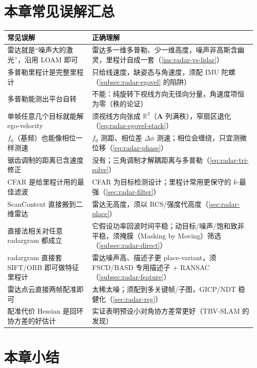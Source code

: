 \section*{本章常见误解汇总}
\begin{table}[H]\centering\small
\begin{tabular}{p{} p{}}
\toprule
\textbf{常见误解} & \textbf{正确理解} \\
\midrule
雷达就是“噪声大的激光”，沿用 LOAM 即可 & 雷达多一维多普勒、少一维高度，噪声非高斯含幽灵，里程计自成一套（\cref{ins:radar-vs-lidar}）\\
多普勒里程计是完整里程计 & 只给线速度，缺姿态与角速度，须配 IMU 陀螺（\cref{subsec:radar-egovel} 的陷阱）\\
多普勒能测出平台自转 & 不能：纯旋转下视线方向无径向分量，角速度项恒为零（秩的论证）\\
单帧任意几个目标就能解 ego-velocity & 须视线方向张成 $\mathbb R^3$（$\mathbf A$ 列满秩），窄扇区退化（\cref{eq:radar-egovel-stack}）\\
$f_0$（基频）也能像相位一样测速 & $f_0$ 测距、相位差 $\Delta\phi$ 测速；相位会缠绕，只宜测微位移（\cref{eq:radar-phase}）\\
锯齿调制的距离已含速度修正 & 没有；三角调制才解耦距离与多普勒（\cref{eq:radar-tri-solve}）\\
CFAR 是给里程计用的最佳滤波 & CFAR 为目标检测设计；里程计常用更保守的 $k$-最强（\cref{sec:radar-filter}）\\
ScanContext 直接搬到二维雷达 & 雷达无高度，须以 RCS/强度代高度（\cref{sec:radar-place}）\\
直接法相关对任意 radargram 都成立 & 它假设功率回波时间平稳；动目标/噪声/饱和致非平稳，须掩膜（Masking by Moving）筛选（\cref{subsec:radar-direct}）\\
radargram 直接套 SIFT/ORB 即可做特征里程计 & 雷达噪声高、描述子更 place-variant，须 FSCD/BASD 专用描述子 $+$ RANSAC（\cref{subsec:radar-feature}）\\
雷达点云直接两帧配准即可 & 太稀太噪；须配到多关键帧/子图，GICP/NDT 稳健化（\cref{sec:radar-reg}）\\
配准代价 Hessian 是回环协方差的好估计 & 实证表明预设小对角协方差常更好（TBV-SLAM 的发现）\\
\bottomrule
\end{tabular}
\end{table}

\section*{本章小结}

